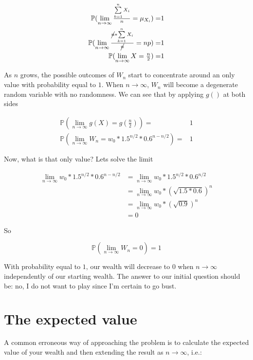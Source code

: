 \documentclass[12pt]{article}
\begin{document}
\begin{equation*}
  \begin{split}
    \mathbb{P}(\lim_{n\to\infty} \tfrac{\sum\limits_{k=1}^{n} X_i}{n} = \mu_{X_i}) =& 1\\
    \mathbb{P}(\lim_{n\to\infty} \tfrac{\cancel{n}*\sum\limits_{k=1}^{n} X_i}{\cancel{n}} = np) =& 1\\
    \mathbb{P}(\lim_{n\to\infty} X = \tfrac{n}{2}) =& 1
  \end{split}
\end{equation*}

As $n$ grows, the possible outcomes of $W_n$ start to concentrate around an only value with probability equal to $1$. When $n \rightarrow \infty$, $W_n$ will become a degenerate random variable with no randomness. We can see that by applying $g()$ at both sides

\begin{equation*}
  \begin{split}
    \mathbb{P}(\lim_{n\to\infty} g(X) = g(\tfrac{n}{2})) =& 1\\
    \mathbb{P}(\lim_{n\to\infty} W_n = w_0 * 1.5^{n/2} * 0.6^{n-n/2}) =& 1
    \end{split}
\end{equation*}

Now, what is that only value? Lets solve the limit

\begin{equation*}
  \begin{split}
    \lim_{n\to\infty} w_0 * 1.5^{n/2} * 0.6^{n-n/2} & = \lim_{n\to\infty}w_0 * 1.5^{n/2} * 0.6^{n/2} \\
    &= \lim_{n\to\infty}w_0 * (\sqrt{1.5*0.6})^{n}\\
    &= \lim_{n\to\infty}w_0 * (\sqrt{0.9}) ^{n}\\
    &= 0
  \end{split}
\end{equation*}

So

\begin{equation*}
    \mathbb{P}(\lim_{n\to\infty} W_n = 0) = 1
\end{equation*}

With probability equal to $1$, our wealth will decrease to 0 when $n\to\infty$ independently of our starting wealth. The answer to our initial question should be: no, I do not want to play since I'm certain to go bust.

\section{The expected value}
A common erroneous way of approaching the problem is to calculate the expected value of your wealth and then extending the result as $n\to\infty$, i.e.:
\end{document}
